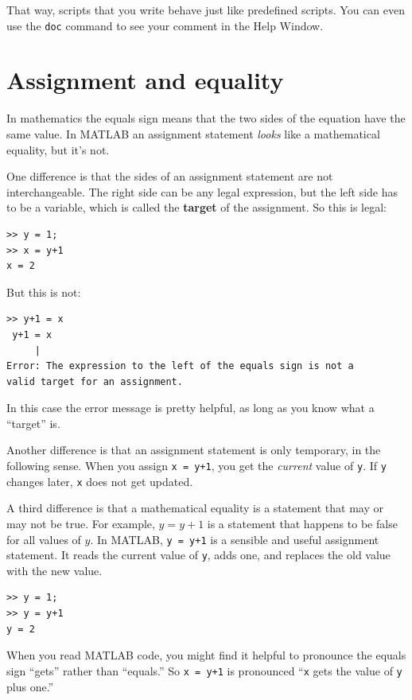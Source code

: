 \documentclass{book}
\begin{document}
That way, scripts that you write behave just like predefined scripts.
You can even use the {\tt doc} command to see your comment in the
Help Window.

\section{Assignment and equality}

In mathematics the equals sign means that the two sides of the
equation have the same value.  In MATLAB an assignment statement
{\em looks} like a mathematical equality, but it's not.

One difference is that the sides of an assignment statement are not
interchangeable.  The right side can be any legal expression, but
the left side has to be a variable, which is called the {\bf
target} of the assignment.  So this is legal:

\begin{verbatim}
>> y = 1;
>> x = y+1
x = 2
\end{verbatim}

But this is not:

\begin{verbatim}
>> y+1 = x
 y+1 = x
     |
Error: The expression to the left of the equals sign is not a
valid target for an assignment.
\end{verbatim}

In this case the error message is pretty helpful, as long as you know
what a ``target'' is.

Another difference is that an assignment statement is only temporary,
in the following sense.  When you assign {\tt x = y+1}, you get the
{\em current} value of {\tt y}.  If {\tt y} changes later, {\tt x}
does not get updated.

A third difference is that a mathematical equality is a statement that
may or may not be true.  For example, $y = y+1$ is a statement that
happens to be false for all values of $y$.  In MATLAB, {\tt y
= y+1} is a sensible and useful assignment statement.  It reads the
current value of {\tt y}, adds one, and replaces the old value with
the new value.

\begin{verbatim}
>> y = 1;
>> y = y+1
y = 2
\end{verbatim}

When you read MATLAB code, you might find it helpful to pronounce
the equals sign ``gets'' rather than ``equals.''  So {\tt x = y+1}
is pronounced ``{\tt x} gets the value of {\tt y} plus one.''
\end{document}
